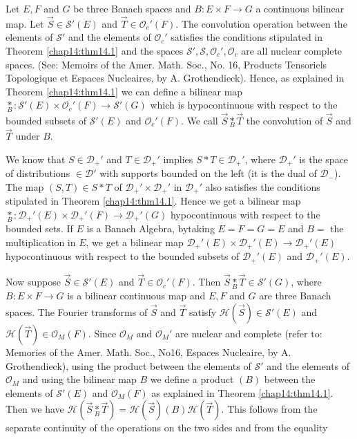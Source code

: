 \vspace{.3cm}

Let $E, F$ and $G$ be three Banach spaces and $B : E \times F \to G$ a
continuous bilinear map. Let $\overrightarrow{S} \in \mathscr{S}'(E)$
and $\overrightarrow{T} \in \mathscr{O}_c'(F)$. The convolution
operation between the elements of $\mathscr{S}'$ and the elements of
$\mathscr{O}_c'$ satisfies the conditions stipulated in Theorem
\ref{chap14:thm14.1} and the spaces $\mathscr{S}', \mathscr{S},
\mathscr{O}_c', \mathscr{O}_c$ are all nuclear complete spaces. (See:
Memoirs of the Amer. Math. Soc., No. 16, Products Tensoriels
Topologique et Espaces Nucleaires, by A. Grothendieck). Hence, as
explained in Theorem \ref{chap14:thm14.1} we can define a bilinear map
$\underset{B}{*} : \mathscr{S}'(E) \times \mathscr{O}_c'(F) \to
\mathscr{S}'(G)$ which is hypocontinuous with respect to the bounded
subsets of $\mathscr{S}'(E)$ and $\mathscr{O}_c'(F)$. We call
$\overrightarrow{S} \underset{B}{*} \overrightarrow{T}$ the
convolution of $\overrightarrow{S}$ and $\overrightarrow{T}$ under
$B$.

We know that $S \in \mathscr{D}_+'$ and $T \in \mathscr{D}_+'$ implies
$S * T \in \mathscr{D}_+'$, where $\mathscr{D}_+'$ is the space of
distributions $\in \mathscr{D}'$ with supports bounded on the left (it
is the dual of $\mathscr{D}_-$). The map $(S, T) \in S * T$ of
$\mathscr{D}_+'\times\mathscr{D}_+'$ in $\mathscr{D}_+'$ also satisfies the 
conditions stipulated in Theorem \ref{chap14:thm14.1}. Hence we get a bilinear
map $\underset{B}{*} : \mathscr{D}_+' (E) \times \mathscr{D}_+' (F)
\to \mathscr{D}_+'(G)$ hypocontinuous with respect to the bounded
sets. If $E$ is a Banach Algebra, by\pageoriginale taking $E = F = G =
E$ and $B =$ the multiplication in $E$, we get a bilinear map
$\mathscr{D}_+'(E) \times \mathscr{D}_+'(E) \to \mathscr{D}_+'(E)$
hypocontinuous with respect to the bounded subsets of
$\mathscr{D}_+'(E)$ and $\mathscr{D}_+'(E)$. 

Now suppose $\overrightarrow{S} \in \mathscr{S}'(E)$ and
$\overrightarrow{T} \in \mathscr{O}_c'(F)$. Then $\overrightarrow{S}
\underset{B}{*} \overrightarrow{T} \in \mathscr{S}'(G)$, where $B : E
\times F \to G$ is a bilinear continuous map and $E, F$ and $G$ are
three Banach spaces. The Fourier transforms of $\overrightarrow{S}$
and $\overrightarrow{T}$ satisfy $\mathscr{H}(\overrightarrow{S}) \in
\mathscr{S}'(E)$ and $\mathscr{H}(\overrightarrow{T}) \in
\mathscr{O}_M(F)$. Since $\mathscr{O}_M$ and $\mathscr{O}_M'$ are
nuclear and complete (refer to: Memories of the Amer. Math. Soc.,
No16, Espaces Nucleaire, by A. Grothendieck), using the product
between the elements of $\mathscr{S}'$ and the elements of
$\mathscr{O}_M$ and using the bilinear map $B$ we define a product
$(B)$ between the elements of $\mathscr{S}'(E)$ and $\mathscr{O}_M(F)$
as explained in Theorem \ref{chap14:thm14.1}. Then we have
$\mathscr{H}(\overrightarrow{S} \underset{B}{*} \overrightarrow{T}) =
\mathscr{H} (\overrightarrow{S}) (B)
\mathscr{H}(\overrightarrow{T})$. This follows from the separate
continuity of the operations on the two sides and from the equality 

